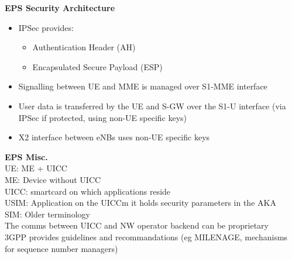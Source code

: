 \documentclass[10pt,letterpaper,landscape]{report}
\newcommand{\boxheight}{21.59cm}
\newcommand{\boxwidth}{8.85cm}
\begin{document}
\begin{small}
{\begin{minipage}[t][\boxheight][c]{\boxwidth}
    \textbf{EPS Security Architecture}
    \begin{itemize}
        \item IPSec provides:
        \begin{itemize}
            \item Authentication Header (AH)
            \item Encapsulated Secure Payload (ESP)
        \end{itemize}
        \item Signalling between UE and MME is managed over S1-MME interface
        \item User data is transferred by the UE and S-GW over the S1-U interface (via IPSec if protected, using non-UE specific keys)
        \item X2 interface between eNBs uses non-UE specific keys
    \end{itemize}
    
    \textbf{EPS Misc.}\\
    UE: ME + UICC\\
    ME: Device without UICC\\
    UICC: smartcard on which applications reside\\
    USIM: Application on the UICCm it holds security parameters in the AKA\\
    SIM: Older terminology\\
    The comms between UICC and NW operator backend can be proprietary \\
    3GPP provides guidelines and recommandations (eg MILENAGE, mechanisms for sequence number managers)
    

\end{minipage}}
\end{small}
\end{document}
